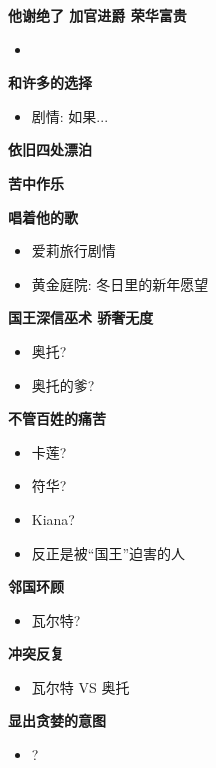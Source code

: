 \documentclass[a4paper]{article}
\begin{document}
\textbf{他谢绝了 加官进爵 荣华富贵}

\begin{itemize}
    \item 
\end{itemize}

\textbf{和许多的选择}

\begin{itemize}
    \item 剧情: 如果...
\end{itemize}

\textbf{依旧四处漂泊}

\textbf{苦中作乐}

\textbf{唱着他的歌}

\begin{itemize}
    \item 爱莉旅行剧情
    \item 黄金庭院: 冬日里的新年愿望
\end{itemize}

\textbf{国王深信巫术 骄奢无度}

\begin{itemize}
    \item 奥托?
    \item 奥托的爹?
\end{itemize}

\textbf{不管百姓的痛苦}

\begin{itemize}
    \item 卡莲?
    \item 符华?
    \item Kiana?
    \item 反正是被“国王”迫害的人
\end{itemize}

\textbf{邻国环顾}

\begin{itemize}
    \item 瓦尔特?
\end{itemize}

\textbf{冲突反复}

\begin{itemize}
    \item 瓦尔特 VS 奥托
\end{itemize}

\textbf{显出贪婪的意图}

\begin{itemize}
    \item ?
\end{itemize}
\end{document}
